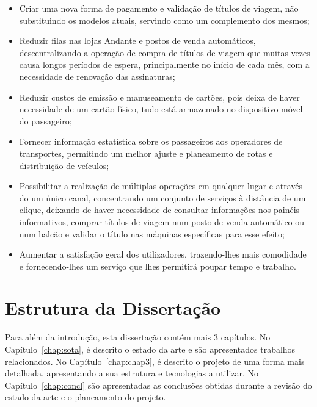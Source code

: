 \begin{itemize}
\item Criar uma nova forma de pagamento e validação de títulos de viagem, não substituindo os modelos atuais, servindo como um complemento dos mesmos;
\item Reduzir filas nas lojas Andante e postos de venda automáticos, descentralizando a operação de compra de títulos de viagem que muitas vezes causa longos períodos de espera, principalmente no início de cada mês, com a necessidade de renovação das assinaturas;
\item Reduzir custos de emissão e manuseamento de cartões, pois deixa de haver necessidade de um cartão físico, tudo está armazenado no dispositivo móvel do passageiro;
\item Fornecer informação estatística sobre os passageiros aos operadores de transportes, permitindo um melhor ajuste e planeamento de rotas e distribuição de veículos;
\item Possibilitar a realização de múltiplas operações em qualquer lugar e através do um único canal, concentrando um conjunto de serviços à distância de um clique, deixando de haver necessidade de consultar informações nos painéis informativos, comprar títulos de viagem num posto de venda automático ou num balcão e validar o título nas máquinas específicas para esse efeito;
\item Aumentar a satisfação geral dos utilizadores, trazendo-lhes mais comodidade e fornecendo-lhes um serviço que lhes permitirá poupar tempo e trabalho.
\end{itemize}

\section{Estrutura da Dissertação} \label{sec:struct}

Para além da introdução, esta dissertação contém mais 3 capítulos.
No Capítulo~\ref{chap:sota}, é descrito o estado da arte e são apresentados trabalhos relacionados. 
No Capítulo~\ref{chap:chap3}, é descrito o projeto de uma forma mais detalhada, apresentando a sua estrutura e tecnologias a utilizar.
No Capítulo~\ref{chap:concl} são apresentadas as conclusões obtidas durante a revisão do estado da arte e o planeamento do projeto.